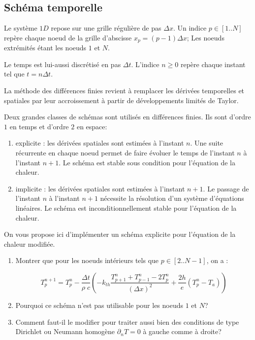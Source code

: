 \documentclass[a4paper, 10pt]{article}
\begin{document}
\subsection{Schéma temporelle}

Le système $1D$ repose sur une grille régulière de pas $\Delta x$.  Un indice $p \in [1..N]$ 
repère chaque noeud de la grille d'abscisse $x_p=(p-1) \Delta x$;  Les noeuds extrémités
étant les noeuds $1$ et $N$.  

Le temps est lui-aussi discrétisé en pas $\Delta t$. L'indice $n \ge 0$ repère chaque instant tel que
$t=n \Delta t$. 

La méthode des différences finies revient à remplacer les dérivées temporelles et spatiales par
leur accroissement à partir de développements limités de Taylor.

Deux grandes classes de schémas sont utilisés en différences finies. Ils sont d'ordre $1$ en temps et d'ordre $2$ en espace:
\begin{enumerate}
\item explicite : les dérivées spatiales sont estimées à l'instant $n$. Une suite récurrente en chaque
noeud permet de faire évoluer le temps de l'instant $n$ à l'instant $n+1$. Le schéma est stable
sous condition pour l'équation de la chaleur.  
\item implicite :  les dérivées spatiales sont estimées à l'instant $n+1$. Le passage de l'instant
$n$ à l'instant $n+1$ nécessite la résolution d'un système d'équations linéaires. Le schéma
est inconditionnellement stable pour l'équation de la chaleur.
\end{enumerate}

On vous propose ici d'implémenter un schéma explicite pour l'équation de la chaleur modifiée.
\begin{enumerate}
\item Montrer que pour les noeuds intérieurs tels que $p \in [2..N-1]$, on a :

\begin{equation}\label{sch1}
T_p^{n + 1}  = T_p^{n} -\frac{\Delta t}{\rho \; c} \left( -k_{th} \frac{T_{p+1}^n+T_{p-1}^n
-2 T_{p}^n}{ \left( \Delta x \right)^2 } + \frac{2h}{e}(T_p^n-T_a) \right)
\end{equation}

\item Pourquoi ce schéma n'est pas utilisable pour les noeuds $1$ et $N$? 
\item Comment faut-il le modifier pour traiter aussi bien des conditions de type Dirichlet ou Neumann
homogène $\partial_n T=0$ à gauche comme à droite?

\end{enumerate}
\end{document}
